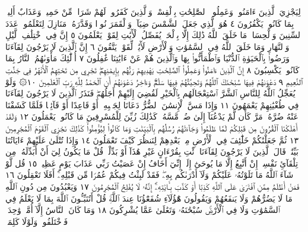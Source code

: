 لِيَجْزِيَ ٱلَّذِينَ ءَامَنُوا۟ وَعَمِلُوا۟ ٱلصَّٰلِحَٰتِ بِٱلْقِسْطِۚ وَٱلَّذِينَ كَفَرُوا۟
لَهُمْ شَرَابࣱ مِّنْ حَمِيمࣲ وَعَذَابٌ أَلِيمُۢ بِمَا كَانُوا۟ يَكْفُرُونَ ٤
هُوَ ٱلَّذِي جَعَلَ ٱلشَّمْسَ ضِيَآءࣰ وَٱلْقَمَرَ نُورࣰا وَقَدَّرَهُۥ مَنَازِلَ
لِتَعْلَمُوا۟ عَدَدَ ٱلسِّنِينَ وَٱلْحِسَابَۚ مَا خَلَقَ ٱللَّهُ ذَٰلِكَ إِلَّا بِٱلْحَقِّۚ
يُفَصِّلُ ٱلْأٓيَٰتِ لِقَوْمࣲ يَعْلَمُونَ ٥ إِنَّ فِي ٱخْتِلَٰفِ ٱلَّيْلِ وَٱلنَّهَارِ
وَمَا خَلَقَ ٱللَّهُ فِي ٱلسَّمَٰوَٰتِ وَٱلْأَرْضِ لَأٓيَٰتࣲ لِّقَوْمࣲ يَتَّقُونَ ٦
إِنَّ ٱلَّذِينَ لَا يَرْجُونَ لِقَآءَنَا وَرَضُوا۟ بِٱلْحَيَوٰةِ ٱلدُّنْيَا وَٱطْمَأَنُّوا۟
بِهَا وَٱلَّذِينَ هُمْ عَنْ ءَايَٰتِنَا غَٰفِلُونَ ٧ أُو۟لَٰٓئِكَ مَأْوَىٰهُمُ
ٱلنَّارُ بِمَا كَانُوا۟ يَكْسِبُونَ ٨ إِنَّ ٱلَّذِينَ ءَامَنُوا۟ وَعَمِلُوا۟
ٱلصَّٰلِحَٰتِ يَهْدِيهِمْ رَبُّهُم بِإِيمَٰنِهِمْۖ تَجْرِي مِن تَحْتِهِمُ
ٱلْأَنْهَٰرُ فِي جَنَّٰتِ ٱلنَّعِيمِ ٩ دَعْوَىٰهُمْ فِيهَا سُبْحَٰنَكَ
ٱللَّهُمَّ وَتَحِيَّتُهُمْ فِيهَا سَلَٰمࣱۚ وَءَاخِرُ دَعْوَىٰهُمْ أَنِ ٱلْحَمْدُ
لِلَّهِ رَبِّ ٱلْعَٰلَمِينَ ١٠۞ وَلَوْ يُعَجِّلُ ٱللَّهُ لِلنَّاسِ ٱلشَّرَّ
ٱسْتِعْجَالَهُم بِٱلْخَيْرِ لَقُضِيَ إِلَيْهِمْ أَجَلُهُمْۖ فَنَذَرُ ٱلَّذِينَ
لَا يَرْجُونَ لِقَآءَنَا فِي طُغْيَٰنِهِمْ يَعْمَهُونَ ١١ وَإِذَا مَسَّ ٱلْإِنسَٰنَ
ٱلضُّرُّ دَعَانَا لِجَنۢبِهِۦٓ أَوْ قَاعِدًا أَوْ قَآئِمࣰا فَلَمَّا كَشَفْنَا
عَنْهُ ضُرَّهُۥ مَرَّ كَأَن لَّمْ يَدْعُنَآ إِلَىٰ ضُرࣲّ مَّسَّهُۥۚ كَذَٰلِكَ زُيِّنَ
لِلْمُسْرِفِينَ مَا كَانُوا۟ يَعْمَلُونَ ١٢ وَلَقَدْ أَهْلَكْنَا ٱلْقُرُونَ
مِن قَبْلِكُمْ لَمَّا ظَلَمُوا۟ وَجَآءَتْهُمْ رُسُلُهُم بِٱلْبَيِّنَٰتِ وَمَا كَانُوا۟
لِيُؤْمِنُوا۟ۚ كَذَٰلِكَ نَجْزِي ٱلْقَوْمَ ٱلْمُجْرِمِينَ ١٣ ثُمَّ جَعَلْنَٰكُمْ
خَلَٰٓئِفَ فِي ٱلْأَرْضِ مِنۢ بَعْدِهِمْ لِنَنظُرَ كَيْفَ تَعْمَلُونَ ١٤
وَإِذَا تُتْلَىٰ عَلَيْهِمْ ءَايَاتُنَا بَيِّنَٰتࣲ قَالَ ٱلَّذِينَ لَا يَرْجُونَ
لِقَآءَنَا ٱئْتِ بِقُرْءَانٍ غَيْرِ هَٰذَآ أَوْ بَدِّلْهُۚ قُلْ مَا يَكُونُ
لِيٓ أَنْ أُبَدِّلَهُۥ مِن تِلْقَآئِ نَفْسِيٓۖ إِنْ أَتَّبِعُ إِلَّا مَا يُوحَىٰٓ إِلَيَّۖ
إِنِّيٓ أَخَافُ إِنْ عَصَيْتُ رَبِّي عَذَابَ يَوْمٍ عَظِيمࣲ ١٥ قُل
لَّوْ شَآءَ ٱللَّهُ مَا تَلَوْتُهُۥ عَلَيْكُمْ وَلَآ أَدْرَىٰكُم بِهِۦۖ
فَقَدْ لَبِثْتُ فِيكُمْ عُمُرࣰا مِّن قَبْلِهِۦٓۚ أَفَلَا تَعْقِلُونَ ١٦
فَمَنْ أَظْلَمُ مِمَّنِ ٱفْتَرَىٰ عَلَى ٱللَّهِ كَذِبًا أَوْ كَذَّبَ بِـَٔايَٰتِهِۦٓۚ
إِنَّهُۥ لَا يُفْلِحُ ٱلْمُجْرِمُونَ ١٧ وَيَعْبُدُونَ مِن دُونِ ٱللَّهِ
مَا لَا يَضُرُّهُمْ وَلَا يَنفَعُهُمْ وَيَقُولُونَ هَٰٓؤُلَآءِ شُفَعَٰٓؤُنَا
عِندَ ٱللَّهِۚ قُلْ أَتُنَبِّـُٔونَ ٱللَّهَ بِمَا لَا يَعْلَمُ فِي ٱلسَّمَٰوَٰتِ وَلَا
فِي ٱلْأَرْضِۚ سُبْحَٰنَهُۥ وَتَعَٰلَىٰ عَمَّا يُشْرِكُونَ ١٨ وَمَا
كَانَ ٱلنَّاسُ إِلَّآ أُمَّةࣰ وَٰحِدَةࣰ فَٱخْتَلَفُوا۟ۚ وَلَوْلَا كَلِمَةࣱ
